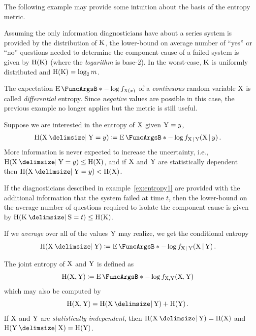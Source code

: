 \documentclass[
    11pt,
    extrafontsizes,
    article,
    oldfontcommands,
    final,
    oneside,
    openany,
    hidelinks]{memoir}
\begin{document}
The following example may provide some intuition about the basis of the entropy metric.
\begin{example}
\label{ex:entropy1}
Assuming the only information diagnosticians have about a series system is provided by the distribution of $\mathrm{K}$, the lower-bound on average number of ``yes'' or ``no'' questions needed to determine the component cause of a failed system is given by $\operatorname{H}(\mathrm{K})$ (where the \emph{logarithm} is base-$2$).
In the worst-case, $\mathrm{K}$ is uniformly distributed and $\operatorname{H}(\mathrm{K}) = \log_2 m$.
\end{example}
The expectation $\Expect{-\log \pdf_{\RV{X}(x)}}$ of a \emph{continuous} random variable $\mathrm{X}$ is called \emph{differential} entropy.
Since \emph{negative} values are possible in this case, the previous example no longer applies but the metric is still useful.

Suppose we are interested in the entropy of $\mathrm{X}$ given $\mathrm{Y} = y$,
\begin{equation}
\entropy(\RV{X} \Given \RV{Y} = y) \coloneqq \Expect{-\log \pdf_{\RV{X} \given \RV{Y}}(\RV{X} \given y)}\,.
\end{equation}
More information is never expected to increase the uncertainty, i.e., $\entropy(\RV{X} \Given \RV{Y} = y) \leq \entropy(\RV{X})$, and if $\mathrm{X}$ and $\mathrm{Y}$ are statistically dependent then $\entropy(\RV{X} \Given \RV{Y} = y) < \entropy(\RV{X})$.

If the diagnosticians described in example~\ref{ex:entropy1} are provided with the additional information that the system failed at time $t$, then the lower-bound on the average number of questions required to isolate the component cause is given by $\entropy(\RV{K} \Given \sv = t) \leq \entropy(\RV{K})$.

If we \emph{average} over all of the values $\mathrm{Y}$ may realize, we get the conditional entropy
\begin{equation}
	\entropy(\RV{X} \Given \RV{Y}) \coloneqq \Expect{-\log \pdf_{\RV{X} \given \RV{Y}}(\RV{X} \given \RV{Y})}\,.
\end{equation}

The joint entropy of $\mathrm{X}$ and $\mathrm{Y}$ is defined as
\begin{equation}
\entropy(\RV{X}, \RV{Y}) \coloneqq \Expect{- \log \pdf_{\RV{X},\RV{Y}}(\RV{X},\RV{Y})}
\end{equation}
which may also be computed by
\begin{equation}
	\entropy(\RV{X},\RV{Y}) = \entropy(\RV{X} \Given \RV{Y}) + \entropy(\RV{Y})\,.
\end{equation}
If $\mathrm{X}$ and $\mathrm{Y}$ are \emph{statistically independent}, then $\entropy(\RV{X} \Given \RV{Y}) = \entropy(\RV{X})$ and $\entropy(\RV{Y} \Given \RV{X}) = \entropy(\RV{Y})$.
\end{document}
